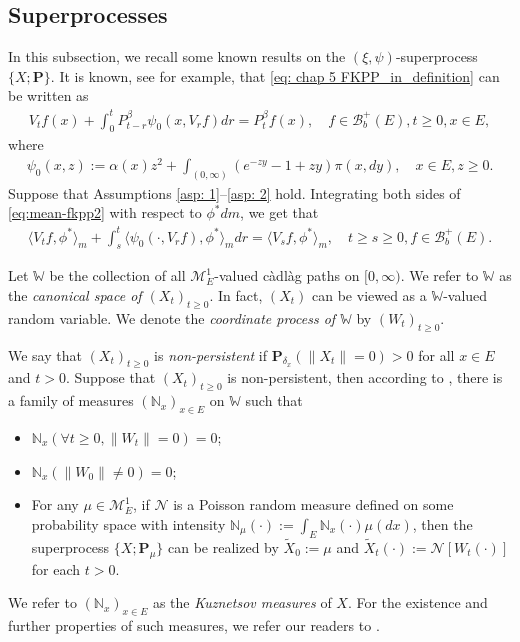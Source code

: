 \documentclass[UTF8]{pkuthss}
\theoremstyle{plain}
\theoremstyle{definition}
\numberwithin{equation}{section}
\begin{document}
\subsection{Superprocesses} \label{sec: Superprocesses}
	In this subsection, we recall some known results on the $(\xi, \psi)$-superprocess $\{X; \mathbf P\}$.
	It is known, see \cite[Theorem 2.23]{Li2011Measure-valued} for example, that \eqref{eq: chap 5 FKPP_in_definition} can be written as
\begin{align}\label{eq:mean-fkpp2}
	V_t f(x) + \int_0^t P^\beta_{t-r} \psi_0(x,V_r f) dr
	= P^\beta_t f(x),
	\quad f \in \mathscr B^+_b(E), t \geq 0,x \in E,
\end{align}
	where
\begin{align}
	\psi_0(x,z)
	:= \alpha(x) z^2 + \int_{(0,\infty)} (e^{-z y} - 1 + z y) \pi(x,dy),
	\quad x \in E,z \geq 0.
\end{align}
    Suppose that Assumptions \ref{asp: 1}--\ref{asp: 2} hold.
    Integrating both sides of \eqref{eq:mean-fkpp2}  with respect to  $\phi^*dm$, we get that
\begin{align}\label{eq:langleVtfphiranglem_equation}
	\langle V_tf,\phi^*\rangle_m + \int_s^t \langle \psi_0(\cdot ,V_r f) , \phi^*\rangle_mdr
	= \langle V_sf,\phi^*\rangle_m,
	\quad t\geq s\geq 0, f\in \mathscr B^+_b(E).
\end{align}

	Let $\mathbb W$ be the collection of all $\mathcal M^1_E$-valued c\`{a}dl\`{a}g paths on $[0,\infty)$.
	We refer to $\mathbb W$ as the \emph{canonical space of $(X_t)_{t\geq 0}$}.
	In fact, $(X_t)$ can be viewed as a $\mathbb W$-valued random variable.
	We denote the \emph{coordinate process of $\mathbb W$} by $(W_t)_{t\geq 0}$.

	We say that $(X_t)_{t\geq 0}$ is \emph{non-persistent} if $\mathbf P_{\delta_x}(\|X_t\|= 0) > 0$ for all $x\in E$ and $t> 0$.
	Suppose that $(X_t)_{t\geq 0}$ is non-persistent,
	then according to \cite[Section 8.4]{Li2011Measure-valued},
	there is a family of measures $(\mathbb N_x)_{x\in E}$ on $\mathbb W$ such that
\begin{itemize}
\item
	$\mathbb N_x (\forall t \geq 0, \|W_t\|=0) =0$;
\item
	$\mathbb N_x(\|W_0 \|\neq 0) = 0$;
\item
	For any $\mu \in \mathcal M_E^1$, if $\mathcal N$ is a Poisson random measure defined on some probability space
	with intensity $\mathbb N_\mu(\cdot):= \int_E \mathbb N_x(\cdot )\mu(dx)$,
	then the superprocess $\{X;\mathbf P_\mu\}$ can be realized by $\widetilde X_0 := \mu$ and $\widetilde X_t(\cdot) := \mathcal N[W_t(\cdot)]$ for each $t>0$.
\end{itemize}
	We refer to $(\mathbb N_x)_{x\in E}$ as the \emph{Kuznetsov measures} of $X$.
	For the existence and further properties of such measures, we refer our readers to \cite{Li2011Measure-valued}.
\end{document}
